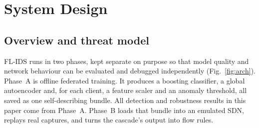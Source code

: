 \section{System Design}
\label{sec:system}
\subsection{Overview and threat model}
FL-IDS runs in two phases, kept separate on purpose so that model quality and network behaviour can be evaluated and debugged independently (Fig.~\ref{fig:arch}). Phase~A is offline federated training. It produces a boosting classifier, a global autoencoder and, for each client, a feature scaler and an anomaly threshold, all saved as one self-describing bundle. All detection and robustness results in this paper come from Phase~A. Phase~B loads that bundle into an emulated SDN, replays real captures, and turns the cascade's output into flow rules.

